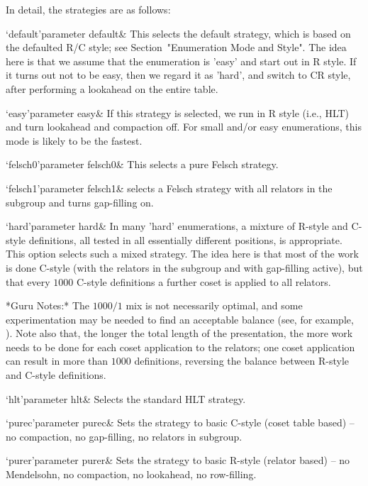 In detail, the strategies are as follows:

\beginitems

\>`default'{parameter default}&
This selects the default strategy, which is based on the defaulted R/C
style;  see Section~"Enumeration Mode  and Style".   The idea  here is
that  we assume  that the  enumeration is  'easy' and  start out  in R
style.  If it turns  out not to be easy, then we  regard it as 'hard',
and switch  to CR  style, after performing  a lookahead on  the entire
table.

\>`easy'{parameter easy}&
If this strategy  is selected, we run in R style  (i.e., HLT) and turn
lookahead  and compaction  off.  For  small and/or  easy enumerations,
this mode is likely to be the fastest.

\>`felsch0'{parameter felsch0}&
This selects a pure Felsch strategy.


\>`felsch1'{parameter felsch1}&
selects a Felsch strategy with  all relators in the subgroup and turns
gap-filling on.

\>`hard'{parameter hard}&
In  many  'hard'  enumerations,  a  mixture  of  R-style  and  C-style
definitions,  all tested  in all  essentially different  positions, is
appropriate.   This option selects  such a  mixed strategy.   The idea
here is  that most of the work  is done C-style (with  the relators in
the  subgroup and  with  gap-filling active),  but  that every  $1000$
C-style definitions a further coset is applied to all relators.

*Guru Notes:*
The $1000/1$ mix is  not necessarily optimal, and some experimentation
may  be  needed to  find  an  acceptable  balance (see,  for  example,
\cite{HR1}).   Note also  that, the  longer  the total  length of  the
presentation,  the  more  work  needs   to  be  done  for  each  coset
application to the relators; one  coset application can result in more
than  $1000$ definitions,  reversing the  balance between  R-style and
C-style definitions.

\>`hlt'{parameter hlt}&
Selects the standard HLT strategy.

\>`purec'{parameter purec}&
Sets  the  strategy  to  basic  C-style  (coset  table  based)  --  no
compaction, no gap-filling, no relators in subgroup.

\>`purer'{parameter purer}&
Sets the strategy  to basic R-style (relator based)  -- no Mendelsohn,
no compaction, no lookahead, no row-filling.

